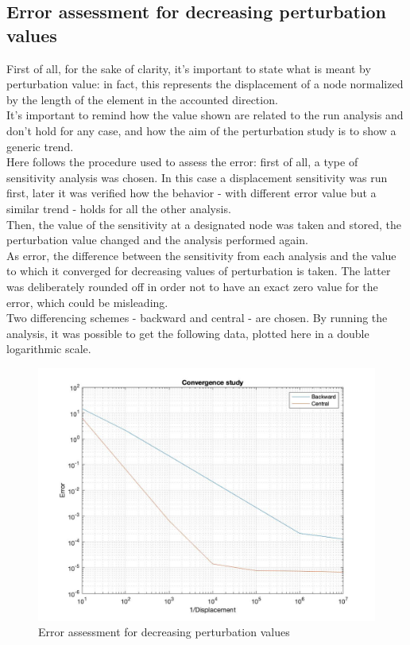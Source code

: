 \subsection{Error assessment for decreasing perturbation values}
First of all, for the sake of clarity, it's important to state what is meant by perturbation value: in fact, this represents the displacement of a node normalized by the length of the element in the accounted direction.\\[3pt]
It's important to remind how the value shown are related to the run analysis and don't hold for any case, and how the aim of the perturbation study is to show a generic trend. \\[3pt]
Here follows the procedure used to assess the error: first of all, a type of sensitivity analysis was chosen. In this case a displacement sensitivity was run first, later it was verified how the behavior - with different error value but a similar trend - holds for all the other analysis. \\[3pt]
Then, the value of the sensitivity at a designated node was taken and stored, the perturbation value changed and the analysis performed again. \\[3pt]
As error, the difference between the sensitivity from each analysis and the value to which it converged for decreasing values of perturbation is taken. The latter was deliberately rounded off in order not to have an exact zero value for the error, which could be misleading.\\[3pt]
Two differencing schemes - backward and central - are chosen.
By running the analysis, it was possible to get the following data, plotted here in a double logarithmic scale.
\begin{figure}[h]
\centering
  \includegraphics[width=140mm]{images/perturbation.jpg}
  \caption{Error assessment for decreasing perturbation values}
\end{figure}
